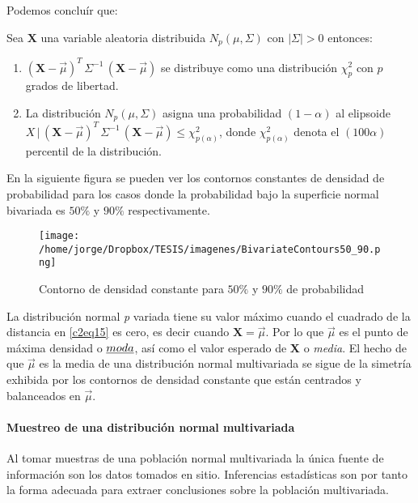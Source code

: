 \documentclass[english]{report}
\begin{document}
\vspace{5pt}

Podemos concluír que:


Sea $\textbf{X}$ una variable aleatoria distribuida $N_p(\mu,\Sigma)$ con $|\Sigma|>0$ entonces:

\vspace{5pt}

\begin{enumerate}
\item $(\textbf{X}-\vec{\mu})^T\,\Sigma^{-1}\,(\textbf{X}-\vec{\mu})$ se distribuye como una distribución $\chi^2_p$ con $p$ grados de libertad.

\item La distribución $N_p(\mu,\Sigma)$ asigna una probabilidad $(1-\alpha)$ al elipsoide
${ X\,|\,(\textbf{X}-\vec{\mu})^T\,\Sigma^{-1}\,(\textbf{X}-\vec{\mu})} \leq \chi^2_{p(\alpha)}$, donde $\chi^2_{p(\alpha)}$ denota el $(100\alpha)$ percentil de la distribución.
\end{enumerate}


\vspace{5pt}

En la siguiente figura se pueden ver los contornos constantes de densidad de probabilidad para los casos donde la probabilidad bajo la superficie normal bivariada es $50\%$ y $90\%$ respectivamente.

\begin{figure}[H]
\centering
\texttt{[image: /home/jorge/Dropbox/TESIS/imagenes/BivariateContours50\_90.png]}
\caption{Contorno de densidad constante para $50\%$ y $90\%$ de probabilidad}
\label{c2f6}
\end{figure}
  

La distribución normal \emph{p} variada tiene su valor máximo cuando el cuadrado de la distancia en \ref{c2eq15} es cero, es decir cuando $\textbf{X}=\vec{\mu}$. Por lo que $\vec{\mu}$ es el punto de máxima densidad o $\emph{moda}$, así como el valor esperado de \textbf{X} o \emph{media}. El hecho de que $\vec{\mu}$ es la media de una distribución normal multivariada se sigue de la simetría exhibida por los contornos de densidad constante que están centrados y balanceados en $\vec{\mu}$.


\paragraph{Muestreo de una distribución normal multivariada}

Al tomar muestras de una población normal multivariada la única fuente de información son los datos tomados en sitio. Inferencias estadísticas son por tanto la forma adecuada para extraer conclusiones sobre la población multivariada.
\end{document}
